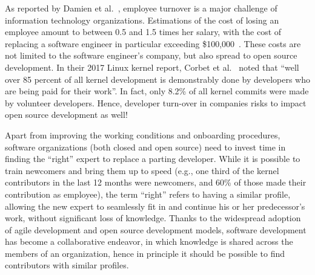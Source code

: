 As reported by Damien et al.~\cite{turnover}, employee turnover is a major challenge of information technology organizations. Estimations of the cost of losing an employee amount to between 0.5 and 1.5 times her salary, with the cost of replacing a software engineer in particular exceeding \$100,000~\cite{economist5988}. These costs are not limited to the software engineer's company, but also spread to open source development. In their 2017 Linux kernel report, Corbet et al.~\cite{corbet17} noted that ``well over 85 percent of all kernel development is demonstrably done by developers who are being paid for their work''. In fact, only 8.2\% of all kernel commits were made by volunteer developers. Hence, developer turn-over in companies risks to impact open source development as well!
%
%

Apart from improving the working conditions and onboarding procedures, software organizations (both closed and open source) need to invest time in finding the ``right'' expert to replace a parting developer. While it is possible to train newcomers and bring them up to speed (e.g., one third of the kernel contributors in the last 12 months were newcomers, and 60\% of those made their contribution as employee), the term ``right'' refers to having a similar profile, allowing the new expert to seamlessly fit in and continue his or her predecessor's work, without significant loss of knowledge. Thanks to the widespread adoption of agile development and open source development models, software development has become a collaborative endeavor, in which knowledge is shared across the members of an organization, hence in principle it should be possible to find contributors with similar profiles.

